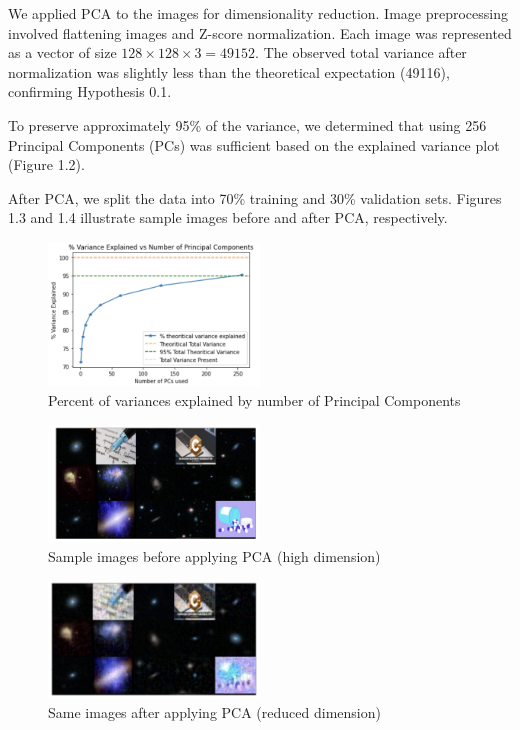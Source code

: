 We applied PCA to the images for dimensionality reduction. Image preprocessing involved flattening images and Z-score normalization. Each image was represented as a vector of size \(128 \times 128 \times 3 = 49152\). The observed total variance after normalization was slightly less than the theoretical expectation (49116), confirming Hypothesis 0.1.

To preserve approximately 95\% of the variance, we determined that using 256 Principal Components (PCs) was sufficient based on the explained variance plot (Figure 1.2).

After PCA, we split the data into 70\% training and 30\% validation sets. Figures 1.3 and 1.4 illustrate sample images before and after PCA, respectively.

\begin{figure}[H]
    \centering
    \includegraphics[width=0.5\textwidth]{Images/percent-variance.png}
    \caption{Percent of variances explained by number of Principal Components}
\end{figure}

\begin{figure}[H]
    \centering
    \includegraphics[width=0.5\textwidth]{Images/before-pca.png}
    \caption{Sample images before applying PCA (high dimension)}
\end{figure}

\begin{figure}[H]
    \centering
    \includegraphics[width=0.5\textwidth]{Images/after-pca.png}
    \caption{Same images after applying PCA (reduced dimension)}
\end{figure}

